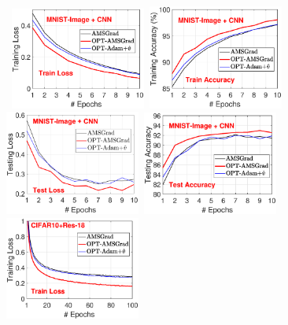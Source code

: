 \documentclass[twoside]{article}
\begin{document}
\begin{figure}
\mbox{\hspace{-0.1in}
\includegraphics[width=1.75in]{new_figure/new_mnist_img_figure/mnist_img_train_loss_disz_2.eps}\hspace{-0.12in}
\includegraphics[width=1.75in]{new_figure/new_mnist_img_figure/mnist_img_train_acc_disz_2.eps}\hspace{-0.12in}
\includegraphics[width=1.75in]{new_figure/mnist_img_test_loss_disz.eps}\hspace{-0.12in}
\includegraphics[width=1.75in]{new_figure/mnist_img_test_acc_disz.eps}
}
\mbox{\hspace{-0.1in}
\includegraphics[width=1.75in]{new_figure/cifar10_train_loss_disz.eps}\hspace{-0.12in}
}
\end{figure}
\end{document}
